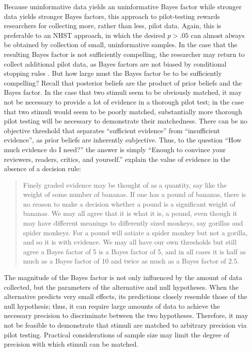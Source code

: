 \documentclass[fignum,nobf,man]{apa}
\begin{document}
Because uninformative data yields an uninformative Bayes factor while stronger data yields stronger Bayes factors, this approach to pilot-testing rewards researchers for collecting more, rather than less, pilot data. Again, this is preferable to an NHST approach, in which the desired $p > .05$ can almost always be obtained by collection of small, uninformative samples.  In the case that the resulting Bayes factor is not sufficiently compelling, the researcher may return to collect additional pilot data, as Bayes factors are not biased by conditional stopping rules \citep{Rouder, 2014}. %
But how large must the Bayes factor be to be sufficiently compelling? Recall that posterior beliefs are the product of prior beliefs and the Bayes factor. In the case that two stimuli seem to be obviously matched, it may not be necessary to provide a lot of evidence in a thorough pilot test; in the case that two stimuli would seem to be poorly matched, substantially more thorough pilot testing will be necessary to demonstrate their matchedness.  There can be no objective threshold that separates ``sufficient evidence'' from ``insufficient evidence'', as prior beliefs are inherently subjective. %
Thus, to the question ``How much evidence do I need?'' the answer is simply ``Enough to convince your reviewers, readers, critics, and yourself.'' \citet[p. 12]{Rouder:etal:submitted} %
explain the value of evidence in the absence of a decision rule: 
\begin{quote}
Finely graded evidence may be thought of as a quantity, say like the weight of some number of bananas. If one has a pound of bananas, there is no reason to make a decision whether a pound is a significant weight of bananas. We may all agree that it is what it is, a pound, even though it may have different meanings to differently sized monkeys, say gorillas and spider monkeys. For a pound will satiate a spider monkey but not a gorilla, and so it is with evidence. We may all have our own thresholds but still agree a Bayes factor of 5 is a Bayes factor of 5, and in all cases it is half as much as a Bayes factor of 10 and twice as much as a Bayes factor of 2.5.
\end{quote}

The magnitude of the Bayes factor is not only influenced by the amount of data collected, but the parameters of the alternative and null hypotheses. When the alternative predicts very small effects, its predictions closely resemble those of the null hypothesis; thus, it can require large amounts of data to achieve the necessary precision to discriminate between the two hypotheses. Therefore, it may not be feasible to demonstrate that stimuli are matched to arbitrary precision via pilot testing.  Practical considerations of sample size may limit the degree of precision with which stimuli can be matched.
\end{document}
